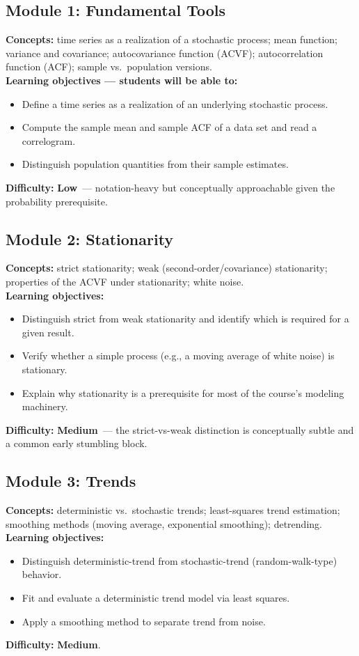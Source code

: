 \documentclass[11pt]{article}
\newcommand{\Low}{\textcolor{diffLow}{\textbf{Low}}}
\newcommand{\Med}{\textcolor{diffMed}{\textbf{Medium}}}
\newcommand{\module}[2]{\subsection*{Module #1: #2}}
\begin{document}
\module{1}{Fundamental Tools}
\textbf{Concepts:} time series as a realization of a stochastic process; mean function; variance and
covariance; autocovariance function (ACVF); autocorrelation function (ACF); sample vs.\ population
versions.\\
\textbf{Learning objectives --- students will be able to:}
\begin{itemize}
  \item Define a time series as a realization of an underlying stochastic process.
  \item Compute the sample mean and sample ACF of a data set and read a correlogram.
  \item Distinguish population quantities from their sample estimates.
\end{itemize}
\textbf{Difficulty:} \Low\ --- notation-heavy but conceptually approachable given the probability
prerequisite.

\module{2}{Stationarity}
\textbf{Concepts:} strict stationarity; weak (second-order/covariance) stationarity; properties of the
ACVF under stationarity; white noise.\\
\textbf{Learning objectives:}
\begin{itemize}
  \item Distinguish strict from weak stationarity and identify which is required for a given result.
  \item Verify whether a simple process (e.g., a moving average of white noise) is stationary.
  \item Explain why stationarity is a prerequisite for most of the course's modeling machinery.
\end{itemize}
\textbf{Difficulty:} \Med\ --- the strict-vs-weak distinction is conceptually subtle and a common
early stumbling block.

\module{3}{Trends}
\textbf{Concepts:} deterministic vs.\ stochastic trends; least-squares trend estimation; smoothing
methods (moving average, exponential smoothing); detrending.\\
\textbf{Learning objectives:}
\begin{itemize}
  \item Distinguish deterministic-trend from stochastic-trend (random-walk-type) behavior.
  \item Fit and evaluate a deterministic trend model via least squares.
  \item Apply a smoothing method to separate trend from noise.
\end{itemize}
\textbf{Difficulty:} \Med.
\end{document}
